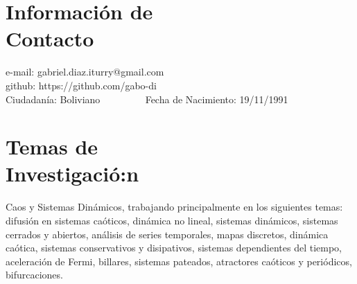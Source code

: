 \documentclass[margin,line]{resume}
\begin{document}
\begin{resume}

    \section{\mysidestyle Informaci\'on de \\Contacto}
    \vspace{2mm}
    e-mail: gabriel.diaz.iturry@gmail.com  \vspace{0mm}\\\vspace{0mm}%
    github: https://github.com/gabo-di \vspace{0mm}\\\vspace{0mm}%
    Ciudadan\'ia: Boliviano     ~~~~~~~~    Fecha de Nacimiento: 19/11/1991               \vspace{0mm}\\\vspace{4.5mm}%
    
    \section{\mysidestyle Temas de \\Investigaci\'o:n}

Caos y Sistemas Dinámicos, trabajando principalmente en los siguientes temas: difusi\'on en sistemas ca\'oticos, din\'amica no lineal, sistemas din\'amicos, sistemas cerrados y abiertos, an\'alisis de series temporales, mapas discretos, din\'amica ca\'otica, sistemas conservativos y disipativos, sistemas dependientes del tiempo, aceleración de Fermi, billares, sistemas pateados, atractores ca\'oticos y peri\'odicos, bifurcaciones.



\end{resume}
\end{document}
